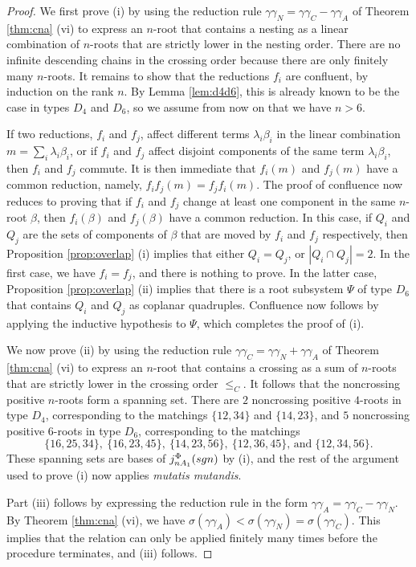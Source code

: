 \documentclass[11pt]{amsart}
\theoremstyle{plain}
\theoremstyle{definition}
\theoremstyle{remark}
\numberwithin{equation}{subsection}
\newcommand{\be}{\beta}
\newcommand{\macd}[2]{j^{#1}_{#2}({\rm{sgn}})}
\begin{document}
\begin{proof}
We first prove (i) by using the reduction rule $\gamma \gamma_N = \gamma
\gamma_C - \gamma \gamma_A$ of Theorem \ref{thm:cna} (vi) to express an $n$-root
that contains a nesting as a linear combination of $n$-roots that are strictly
lower in the nesting order.  There are no infinite descending chains in the
crossing order because there are only finitely many $n$-roots. It remains to
show that the reductions $f_i$ are confluent, by induction on the rank $n$.  By
Lemma \ref{lem:d4d6}, this is already known to be the case in types $D_4$ and
$D_6$, so we assume from now on that we have $n > 6$.

If two reductions, $f_i$ and $f_j$, affect different terms $\lambda_i \be_i$ in
the linear combination $m = \sum_i \lambda_i \be_i$, or if $f_i$ and $f_j$
affect disjoint components of the same term $\lambda_i \be_i$, then $f_i$ and
$f_j$ commute. It is then immediate that $f_i(m)$ and $f_j(m)$ have a common
reduction, namely, $f_if_j(m) = f_jf_i(m)$.  The proof of confluence now reduces
to proving that if $f_i$ and $f_j$ change at least one component in the same
$n$-root $\be$, then $f_i(\be)$ and $f_j(\be)$ have a common reduction.  In this
case, if $Q_i$ and $Q_j$ are the sets of components of $\be$ that are moved by
$f_i$ and $f_j$ respectively, then Proposition \ref{prop:overlap} (i) implies
that either $Q_i = Q_j$, or $|Q_i \cap Q_j| = 2$. In the first case, we have
$f_i = f_j$, and there is nothing to prove. In the latter case, Proposition
\ref{prop:overlap} (ii) implies that there is a root subsystem $\Psi$ of type
$D_6$ that contains $Q_i$ and $Q_j$ as coplanar quadruples. Confluence now
follows by applying the inductive hypothesis to $\Psi$, which completes the
proof of (i).

We now prove (ii) by using the reduction rule $\gamma \gamma_C = \gamma \gamma_N
+ \gamma \gamma_A$ of Theorem \ref{thm:cna} (vi) to express an $n$-root that
contains a crossing as a sum of $n$-roots that are strictly lower in the
crossing order $\leq_C$. It follows that the noncrossing positive $n$-roots
form a spanning set. There are $2$ noncrossing positive $4$-roots in type $D_4$,
corresponding to the matchings $\{12, 34\}$ and $\{14,23\}$, and $5$ noncrossing
positive $6$-roots in type $D_6$, corresponding to the matchings $$ \{16, 25,
34\}, \ \{16, 23, 45\}, \ \{14, 23, 56\}, \ \{12, 36, 45\}, \,\text{and}\; \{12,
34, 56\}.$$ These spanning sets are bases of $\macd{\Phi}{nA_1}$ by (i), and the
rest of the argument used to prove (i) now applies {\it mutatis mutandis}.

Part (iii) follows by expressing the reduction rule in the form $\gamma \gamma_A
= \gamma \gamma_C - \gamma \gamma_N.$ By Theorem \ref{thm:cna} (vi), we have
$\sigma(\gamma\gamma_A) < \sigma(\gamma\gamma_N) = \sigma(\gamma\gamma_C)$. This
implies that the relation can only be applied finitely many times before the
procedure terminates, and (iii) follows.
\end{proof}
\end{document}

